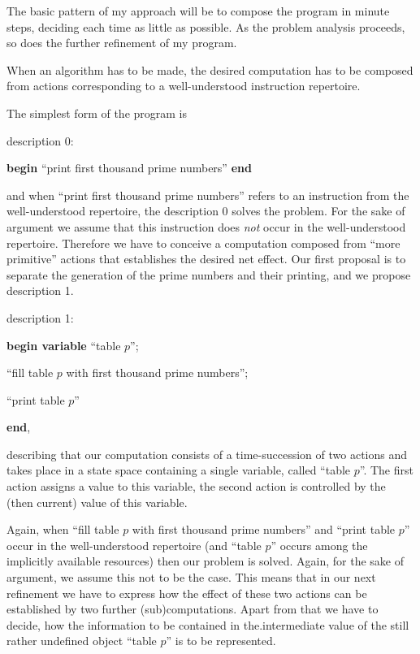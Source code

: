 The basic pattern of my approach will be to compose the program in minute steps, deciding each time as little as possible. As the problem analysis proceeds, so does the further refinement of my program.

When an algorithm has to be made, the desired computation has to be composed from actions corresponding to a well-understood instruction repertoire.

The simplest form of the program is
\medskip

\noindent
description 0:

\textbf{begin} ``print first thousand prime numbers'' \textbf{end}

\noindent
and when ``print first thousand prime numbers'' refers to an instruction from the well-understood repertoire, the description 0 solves the problem. For the sake of argument we assume that this instruction does \textit{not} occur in the well-understood repertoire. Therefore we have to conceive a computation composed from ``more primitive'' actions that establishes the desired net effect. Our first proposal is to separate the generation of the prime numbers and their printing, and we propose description 1.
\medskip

\noindent
description 1:

\textbf{begin variable} ``table $p$'';

\quad ``fill table $p$ with first thousand prime numbers'';

\quad ``print table $p$''

\textbf{end},

\noindent
describing that our computation consists of a time-succession of two actions and takes place in a state space containing a single variable, called ``table $p$''. The first action assigns a value to this variable, the second action is controlled by the (then current) value of this variable.

Again, when ``fill table $p$ with first thousand prime numbers'' and ``print table $p$'' occur in the well-understood repertoire (and ``table $p$'' occurs among the implicitly available resources) then our problem is solved. Again, for the sake of argument, we assume this not to be the case. This means that in our next refinement we have to express how the effect of these two actions can be established by two further (sub)computations. Apart from that we have to decide, how the information to be contained in the.intermediate value of the still rather undefined object ``table $p$'' is to be represented.

